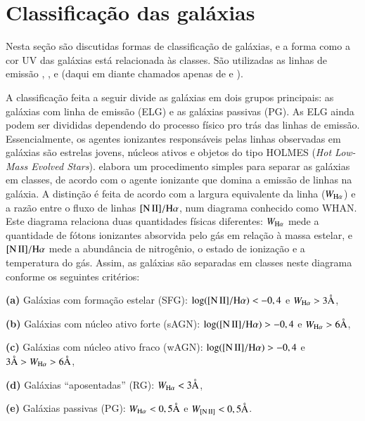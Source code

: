 
\section{Classificação das galáxias}

Nesta seção são discutidas formas de classificação de galáxias, e a forma como a
cor UV das galáxias está relacionada às classes. São utilizadas as linhas de
emissão \Halpha, \Hbeta, \NII e \OIII (daqui em diante chamados apenas de \nII e
\oIII).

A classificação feita a seguir divide as galáxias em dois grupos principais: as
galáxias com linha de emissão (ELG) e as galáxias passivas (PG). As ELG ainda
podem ser divididas dependendo do processo físico pro trás das linhas de
emissão. Essencialmente, os agentes ionizantes responsáveis pelas linhas
observadas em galáxias são estrelas jovens, núcleos ativos e objetos do tipo
HOLMES ({\em Hot Low-Mass Evolved Stars}). \citet{CidFernandes2011} elabora um
procedimento simples para separar as galáxias em classes, de acordo com o agente
ionizante que domina a emissão de linhas na galáxia. A distinção é feita de
acordo com a largura equivalente da linha \Halpha ($W_{\mathrm{H}\alpha}$) e a razão entre o
fluxo de linhas $\nII/\Halpha$, num diagrama conhecido como WHAN. Este diagrama
relaciona duas quantidades físicas diferentes: $W_{\mathrm{H}\alpha}$ mede a quantidade de
fótons ionizantes absorvida pelo gás em relação à massa estelar, e
$\nII/\Halpha$ mede a abundância de nitrogênio, o estado de ionização e a
temperatura do gás. Assim, as galáxias são separadas em classes neste diagrama
conforme os seguintes critérios:

\begin{list}{}{\setlength\itemsep{0pt}}
\item \textbf{(a)} Galáxias com formação estelar (SFG): $\log(\nII/\Halpha) <
-0,4$ e $W_{\mathrm{H}\alpha} > 3\text{\AA}$,
\item \textbf{(b)} Galáxias com núcleo ativo forte (sAGN): $\log(\nII/\Halpha) >
-0,4$ e $W_{\mathrm{H}\alpha} > 6\text{\AA}$,
\item \textbf{(c)} Galáxias com núcleo ativo fraco (wAGN): $\log(\nII/\Halpha) >
-0,4$ e $3\text{\AA} > W_{\mathrm{H}\alpha} > 6\text{\AA}$,
\item \textbf{(d)} Galáxias ``aposentadas'' (RG): $W_{\mathrm{H}\alpha} < 3\text{\AA}$,
\item \textbf{(e)} Galáxias passivas (PG): $W_{\mathrm{H}\alpha} < 0,5\text{\AA}$ e $W_{\mathrm{[N\,II]}} <
0,5\text{\AA}$.
\end{list}

